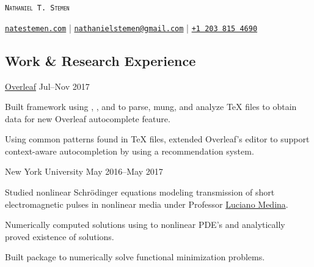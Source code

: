 \documentclass{cultvoucher}
\begin{document}
\begin{flushleft}
    {\Huge{\textsc{\texttt{Nathaniel T. Stemen}}}}
    
    {\href{https://natestemen.com}{\texttt{natestemen.com}} |
    \href{mailto:nathanielstemen@gmail.com}{\nolinkurl{nathanielstemen@gmail.com}}} |
    \href{tel:12038154690}{\texttt{+1\,203\,815\,4690}}
\end{flushleft}

\vspace{-10pt}

\begin{paracol}{2}

\section{Work \& Research Experience}

         {\href{https://www.overleaf.com/}{Overleaf}}
         {Jul--Nov 2017}
\begin{tightitemize}
    \item Built framework using , , and
           to parse, mung, and analyze \TeX{} files to obtain
          data for new Overleaf autocomplete feature.
    \item Using common patterns found in \TeX{} files, extended Overleaf's
          editor to support context-aware autocompletion by using a
          recommendation system.
\end{tightitemize}

         {New York University}
         {May 2016--May 2017}
\begin{tightitemize}
	\item Studied nonlinear Schr\"{o}dinger equations modeling transmission of
          short electromagnetic pulses in nonlinear media under Professor
          \href{https://www.sites.google.com/a/nyu.edu/luciano-medina/}{Luciano Medina}.
	\item Numerically computed solutions using  to nonlinear
          PDE's and analytically proved existence of solutions.
	\item Built package to numerically solve functional minimization problems.
\end{tightitemize}


\end{paracol}
\end{document}
